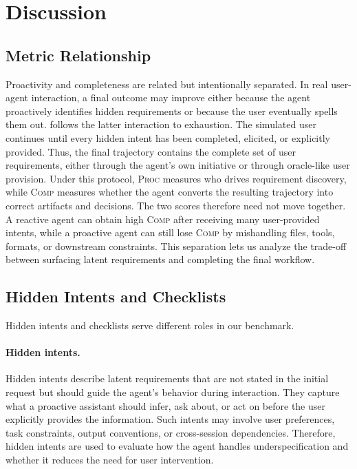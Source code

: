 
\section{Discussion}

\subsection{Metric Relationship}
\label{app:metric_relationship}
Proactivity and completeness are related but intentionally separated. In real user-agent interaction, a final outcome may improve either because the agent proactively identifies hidden requirements or because the user eventually spells them out. {\bench} follows the latter interaction to exhaustion. The simulated user continues until every hidden intent has been completed, elicited, or explicitly provided. Thus, the final trajectory contains the complete set of user requirements, either through the agent's own initiative or through oracle-like user provision. Under this protocol, \textsc{Proc} measures who drives requirement discovery, while \textsc{Comp} measures whether the agent converts the resulting trajectory into correct artifacts and decisions. The two scores therefore need not move together. A reactive agent can obtain high \textsc{Comp} after receiving many user-provided intents, while a proactive agent can still lose \textsc{Comp} by mishandling files, tools, formats, or downstream constraints. This separation lets us analyze the trade-off between surfacing latent requirements and completing the final workflow.

\subsection{Hidden Intents and Checklists}
\label{app:hidden_intents_checklists}

Hidden intents and checklists serve different roles in our benchmark.

\paragraph{Hidden intents.} Hidden intents describe latent requirements that are not stated in the initial request but should guide the agent's behavior during interaction. They capture what a proactive assistant should infer, ask about, or act on before the user explicitly provides the information. Such intents may involve user preferences, task constraints, output conventions, or cross-session dependencies. Therefore, hidden intents are used to evaluate how the agent handles underspecification and whether it reduces the need for user intervention.

